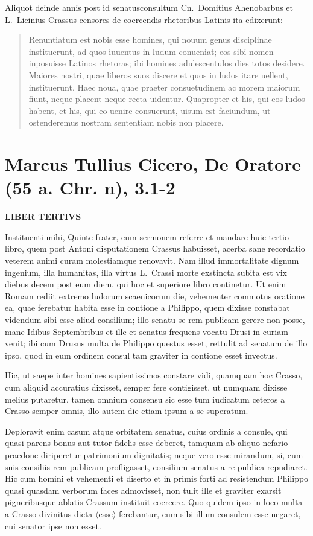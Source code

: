  	
Aliquot deinde annis post id senatusconsultum Cn.~Domitius Ahenobarbus et L.~Licinius Crassus censores de coercendis rhetoribus Latinis ita edixerunt:
\begin{quotation}
\noindent Renuntiatum est nobis esse homines, qui nouum genus disciplinae instituerunt, ad quos iuuentus in ludum conueniat; eos sibi nomen inposuisse Latinos rhetoras; ibi homines adulescentulos dies totos desidere. Maiores nostri, quae liberos suos discere et quos in ludos itare uellent, instituerunt. Haec noua, quae praeter consuetudinem ac morem maiorum fiunt, neque placent neque recta uidentur. Quapropter et his, qui eos ludos habent, et his, qui eo uenire consuerunt, uisum est faciundum, ut ostenderemus nostram sententiam nobis non placere.
\end{quotation}



\section*{Marcus Tullius Cicero, De Oratore (55 a. Chr. n), 3.1-2}

 	
\textbf{LIBER TERTIVS}

\medskip

\noindent Instituenti mihi, Quinte frater, eum sermonem referre et mandare huic tertio libro, quem post Antoni disputationem Crassus habuisset, acerba sane recordatio veterem animi curam molestiamque renovavit. Nam illud immortalitate dignum ingenium, illa humanitas, illa virtus L.~Crassi morte exstincta subita est vix diebus decem post eum diem, qui hoc et superiore libro continetur. Ut enim Romam rediit extremo ludorum scaenicorum die, vehementer commotus oratione ea, quae ferebatur habita esse in contione a Philippo, quem dixisse constabat videndum sibi esse aliud consilium; illo senatu se rem publicam gerere non posse, mane Idibus Septembribus et ille et senatus frequens vocatu Drusi in curiam venit; ibi cum Drusus multa de Philippo questus esset, rettulit ad senatum de illo ipso, quod in eum ordinem consul tam graviter in contione esset invectus.

Hic, ut saepe inter homines sapientissimos constare vidi, quamquam hoc Crasso, cum aliquid accuratius dixisset, semper fere contigisset, ut numquam dixisse melius putaretur, tamen omnium consensu sic esse tum iudicatum ceteros a Crasso semper omnis, illo autem die etiam ipsum a se superatum. 

Deploravit enim casum atque orbitatem senatus, cuius ordinis a consule, qui quasi parens bonus aut tutor fidelis esse deberet, tamquam ab aliquo nefario praedone diriperetur patrimonium dignitatis; neque vero esse mirandum, si, cum suis consiliis rem publicam profligasset, consilium senatus a re publica repudiaret. Hic cum homini et vehementi et diserto et in primis forti ad resistendum Philippo quasi quasdam verborum faces admovisset, non tulit ille et graviter exarsit pigneribusque ablatis Crassum instituit coercere. Quo quidem ipso in loco multa a Crasso divinitus dicta $\langle$esse$\rangle$ ferebantur, cum sibi illum consulem esse negaret, cui senator ipse non esset.

